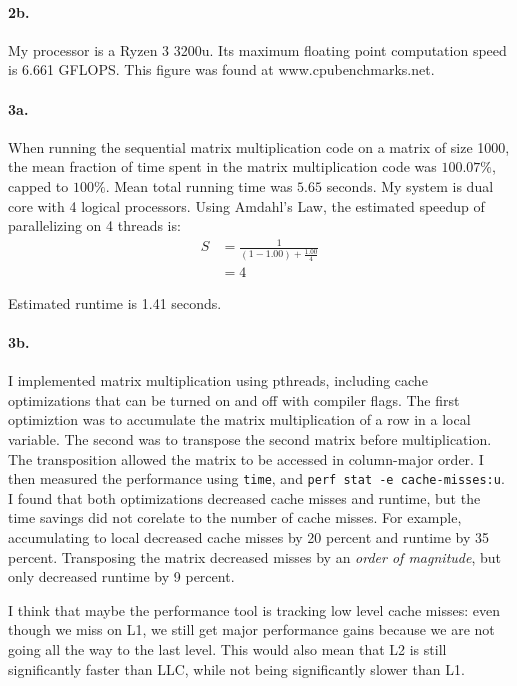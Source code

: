 \documentclass[letterpaper]{article}
\begin{document}
\paragraph{2b.} My processor is a Ryzen 3 3200u. Its maximum floating point
computation speed is 6.661 GFLOPS. This figure was found at
www.cpubenchmarks.net.

\paragraph{3a.} When running the sequential matrix multiplication code on a
matrix of size 1000, the mean fraction of time spent in the matrix
multiplication code was $100.07\%$, capped to $100\%$. Mean total running time
was $5.65$ seconds. My system is dual core with 4 logical processors. Using
Amdahl's Law, the estimated speedup of parallelizing on 4 threads is:
\begin{align*}
    S &= \frac{1}{(1 - 1.00) + \frac{1.00}{4}} \\
      &= 4
\end{align*}

Estimated runtime is 1.41 seconds.

\paragraph{3b.} I implemented matrix multiplication using pthreads, including
cache optimizations that can be turned on and off with compiler flags. The first
optimiztion was to accumulate the matrix multiplication of a row in a local
variable. The second was to transpose the second matrix before multiplication.
The transposition allowed the matrix to be accessed in column-major order. I
then measured the performance using \texttt{time}, and \texttt{perf stat -e
cache-misses:u}. I found that both optimizations decreased cache misses and
runtime, but the time savings did not corelate to the number of cache misses.
For example, accumulating to local decreased cache misses by 20 percent and
runtime by 35 percent. Transposing the matrix decreased misses by an \emph{
    order of magnitude}, but only decreased runtime by 9 percent.

I think that maybe the performance tool is tracking low
level cache misses: even though we miss on L1, we still get major performance
gains because we are not going all the way to the last level. This would also
mean that L2 is still significantly faster than LLC, while not being
significantly slower than L1.
\end{document}
